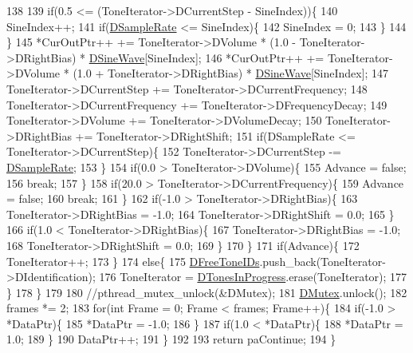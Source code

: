 \begin{DoxyCode}
138             
139             \textcolor{keywordflow}{if}(0.5 <= (ToneIterator->DCurrentStep - SineIndex))\{
140                 SineIndex++;
141                 \textcolor{keywordflow}{if}(\hyperlink{classCSoundLibraryMixer_af2d94eb0c2b55d92ff00d18a25cbed6a}{DSampleRate} <= SineIndex)\{
142                     SineIndex = 0;   
143                 \}
144             \}
145             *CurOutPtr++ += ToneIterator->DVolume * (1.0 - ToneIterator->DRightBias) * 
      \hyperlink{classCSoundLibraryMixer_a7d696c93362c862bfc651a28ee8f67cf}{DSineWave}[SineIndex];
146             *CurOutPtr++ += ToneIterator->DVolume * (1.0 + ToneIterator->DRightBias) * 
      \hyperlink{classCSoundLibraryMixer_a7d696c93362c862bfc651a28ee8f67cf}{DSineWave}[SineIndex];
147             ToneIterator->DCurrentStep += ToneIterator->DCurrentFrequency;
148             ToneIterator->DCurrentFrequency += ToneIterator->DFrequencyDecay;
149             ToneIterator->DVolume += ToneIterator->DVolumeDecay;
150             ToneIterator->DRightBias += ToneIterator->DRightShift;
151             \textcolor{keywordflow}{if}(DSampleRate <= ToneIterator->DCurrentStep)\{
152                 ToneIterator->DCurrentStep -= \hyperlink{classCSoundLibraryMixer_af2d94eb0c2b55d92ff00d18a25cbed6a}{DSampleRate};
153             \}
154             \textcolor{keywordflow}{if}(0.0 > ToneIterator->DVolume)\{
155                 Advance = \textcolor{keyword}{false};
156                 \textcolor{keywordflow}{break};
157             \}
158             \textcolor{keywordflow}{if}(20.0 > ToneIterator->DCurrentFrequency)\{
159                 Advance = \textcolor{keyword}{false};
160                 \textcolor{keywordflow}{break};
161             \}
162             \textcolor{keywordflow}{if}(-1.0 > ToneIterator->DRightBias)\{
163                 ToneIterator->DRightBias = -1.0;
164                 ToneIterator->DRightShift = 0.0;
165             \}
166             \textcolor{keywordflow}{if}(1.0 < ToneIterator->DRightBias)\{
167                 ToneIterator->DRightBias = -1.0;
168                 ToneIterator->DRightShift = 0.0;                
169             \}
170         \}        
171         \textcolor{keywordflow}{if}(Advance)\{
172             ToneIterator++;    
173         \}
174         \textcolor{keywordflow}{else}\{
175             \hyperlink{classCSoundLibraryMixer_a2d1389368651db10fd6fd8b3cd08c164}{DFreeToneIDs}.push\_back(ToneIterator->DIdentification);   
176             ToneIterator = \hyperlink{classCSoundLibraryMixer_a39bb9c811d842a282b6b7058ac7dfe1c}{DTonesInProgress}.erase(ToneIterator);
177         \}
178     \}
179     
180     \textcolor{comment}{//pthread\_mutex\_unlock(&DMutex);    }
181     \hyperlink{classCSoundLibraryMixer_a955562a0638df831413a1c6b8860f9fb}{DMutex}.unlock();
182     frames *= 2;
183     \textcolor{keywordflow}{for}(\textcolor{keywordtype}{int} Frame = 0; Frame < frames; Frame++)\{
184         \textcolor{keywordflow}{if}(-1.0 > *DataPtr)\{
185             *DataPtr = -1.0;
186         \}
187         \textcolor{keywordflow}{if}(1.0 < *DataPtr)\{
188             *DataPtr = 1.0;
189         \}
190         DataPtr++;
191     \}
192     
193     \textcolor{keywordflow}{return} paContinue;
194 \}
\end{DoxyCode}
